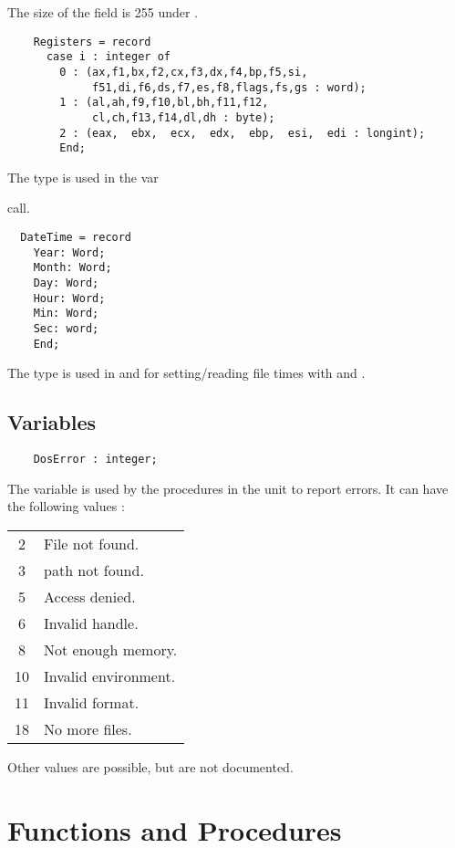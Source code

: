 The size of the  field is 255 under \linux.
\begin{verbatim}
    Registers = record
      case i : integer of
        0 : (ax,f1,bx,f2,cx,f3,dx,f4,bp,f5,si,
             f51,di,f6,ds,f7,es,f8,flags,fs,gs : word);
        1 : (al,ah,f9,f10,bl,bh,f11,f12,
             cl,ch,f13,f14,dl,dh : byte);
        2 : (eax,  ebx,  ecx,  edx,  ebp,  esi,  edi : longint);
        End;
\end{verbatim}
The   type is used in the var{ call.
\begin{verbatim}
  DateTime = record
    Year: Word;
    Month: Word;
    Day: Word;
    Hour: Word;
    Min: Word;
    Sec: word;
    End;
\end{verbatim}
The  type is used in  and  for
setting/reading file times with  and .

\subsection{Variables}
\begin{verbatim}
    DosError : integer;
\end{verbatim}
The  variable is used by the procedures in the \dos unit to 
report errors. It can have the following values :
\begin{center}
\begin{tabular}{cl}
2 & File not found. \\
3 & path not found. \\
5 & Access denied. \\
6 & Invalid handle. \\
8 & Not enough memory. \\
10 & Invalid environment. \\
11 & Invalid format. \\
18 & No more files.
\end{tabular}
\end{center}
Other values are possible, but are not documented.

\section{Functions and Procedures}

}
